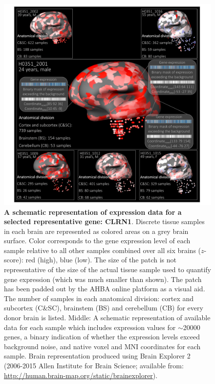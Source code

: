 \begin{figure}[h!]
  \centering
    \includegraphics[width=1\textwidth]{Chapter4/Ch4Fig1.pdf}
\caption{\textbf{A schematic representation of expression data for a selected representative gene: CLRN1}. Discrete tissue samples in each brain are represented as colored areas on a grey brain surface. Color corresponds to the gene expression level of each sample relative to all other samples combined over all six brains ($z$-score): red (high), blue (low). The size of the patch is not representative of the size of the actual tissue sample used to quantify gene expression (which was much smaller than shown). The patch has been padded out by the AHBA online platform as a visual aid. The number of samples in each anatomical division: cortex and subcortex (C\&SC), brainstem (BS) and cerebellum (CB) for every donor brain is listed. Middle: A schematic representation of available data for each sample which includes expression values for $\sim$\num{20000} genes, a binary indication of whether the expression levels exceed background noise, and native voxel and MNI coordinates for each sample. Brain representation produced using Brain Explorer 2 (2006-2015 Allen Institute for Brain Science; available from: \url{http://human.brain-map.org/static/brainexplorer}). }
\label{fig:Ch4Fig1}
\end{figure}

